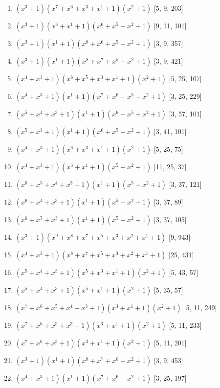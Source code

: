 \documentclass[10pt,twocolumn]{article}
\begin{document}
\begin{enumerate}
\item $(x^{3} + 1)(x^{7} + x^{6} + x^{3} + x^{1} + 1)(x^{2} + 1)$  [5, 9, 203]
\item $(x^{3} + 1)(x^{3} + x^{1} + 1)(x^{6} + x^{5} + x^{2} + 1)$  [9, 11, 101]
\item $(x^{3} + 1)(x^{1} + 1)(x^{8} + x^{6} + x^{5} + x^{2} + 1)$  [3, 9, 357]
\item $(x^{3} + 1)(x^{1} + 1)(x^{8} + x^{7} + x^{5} + x^{2} + 1)$  [3, 9, 421]
\item $(x^{4} + x^{3} + 1)(x^{6} + x^{5} + x^{3} + x^{1} + 1)(x^{2} + 1)$  [5, 25, 107]
\item $(x^{4} + x^{3} + 1)(x^{1} + 1)(x^{7} + x^{6} + x^{5} + x^{2} + 1)$  [3, 25, 229]
\item $(x^{5} + x^{4} + x^{3} + 1)(x^{1} + 1)(x^{6} + x^{5} + x^{2} + 1)$  [3, 57, 101]
\item $(x^{5} + x^{3} + 1)(x^{1} + 1)(x^{6} + x^{5} + x^{2} + 1)$  [3, 41, 101]
\item $(x^{4} + x^{3} + 1)(x^{6} + x^{3} + x^{1} + 1)(x^{2} + 1)$  [5, 25, 75]
\item $(x^{4} + x^{3} + 1)(x^{3} + x^{1} + 1)(x^{5} + x^{2} + 1)$  [11, 25, 37]
\item $(x^{6} + x^{5} + x^{4} + x^{3} + 1)(x^{1} + 1)(x^{5} + x^{2} + 1)$  [3, 37, 121]
\item $(x^{6} + x^{4} + x^{3} + 1)(x^{1} + 1)(x^{5} + x^{2} + 1)$  [3, 37, 89]
\item $(x^{6} + x^{5} + x^{3} + 1)(x^{1} + 1)(x^{5} + x^{2} + 1)$  [3, 37, 105]
\item $(x^{3} + 1)(x^{9} + x^{8} + x^{7} + x^{5} + x^{3} + x^{2} + x^{1} + 1)$  [9, 943]
\item $(x^{4} + x^{3} + 1)(x^{8} + x^{7} + x^{5} + x^{3} + x^{2} + x^{1} + 1)$  [25, 431]
\item $(x^{5} + x^{4} + x^{3} + 1)(x^{5} + x^{3} + x^{1} + 1)(x^{2} + 1)$  [5, 43, 57]
\item $(x^{5} + x^{4} + x^{3} + 1)(x^{5} + x^{1} + 1)(x^{2} + 1)$  [5, 35, 57]
\item $(x^{7} + x^{6} + x^{5} + x^{4} + x^{3} + 1)(x^{3} + x^{1} + 1)(x^{2} + 1)$  [5, 11, 249]
\item $(x^{7} + x^{6} + x^{5} + x^{3} + 1)(x^{3} + x^{1} + 1)(x^{2} + 1)$  [5, 11, 233]
\item $(x^{7} + x^{6} + x^{3} + 1)(x^{3} + x^{1} + 1)(x^{2} + 1)$  [5, 11, 201]
\item $(x^{3} + 1)(x^{1} + 1)(x^{8} + x^{7} + x^{6} + x^{2} + 1)$  [3, 9, 453]
\item $(x^{4} + x^{3} + 1)(x^{1} + 1)(x^{7} + x^{6} + x^{2} + 1)$  [3, 25, 197]

\end{enumerate}
\end{document}
